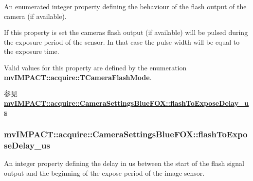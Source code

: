 An enumerated integer property defining the behaviour of the flash output of the camera (if available). 

If this property is set the cameras flash output (if available) will be pulsed during the exposure period of the sensor. In that case the pulse width will be equal to the exposure time.

Valid values for this property are defined by the enumeration {\bfseries mv\+I\+M\+P\+A\+C\+T\+::acquire\+::\+T\+Camera\+Flash\+Mode}.

\begin{DoxySeeAlso}{参见}
{\bfseries \hyperlink{classmv_i_m_p_a_c_t_1_1acquire_1_1_camera_settings_blue_f_o_x_af918a5013ceba642fc62182417b23340}{mv\+I\+M\+P\+A\+C\+T\+::acquire\+::\+Camera\+Settings\+Blue\+F\+O\+X\+::flash\+To\+Expose\+Delay\+\_\+us}} 
\end{DoxySeeAlso}
\hypertarget{classmv_i_m_p_a_c_t_1_1acquire_1_1_camera_settings_blue_f_o_x_af918a5013ceba642fc62182417b23340}{
\subsubsection[{flash\+To\+Expose\+Delay\+\_\+us}]{ mv\+I\+M\+P\+A\+C\+T\+::acquire\+::\+Camera\+Settings\+Blue\+F\+O\+X\+::flash\+To\+Expose\+Delay\+\_\+us}}\label{classmv_i_m_p_a_c_t_1_1acquire_1_1_camera_settings_blue_f_o_x_af918a5013ceba642fc62182417b23340}


An integer property defining the delay in us between the start of the flash signal output and the beginning of the expose period of the image sensor. 

